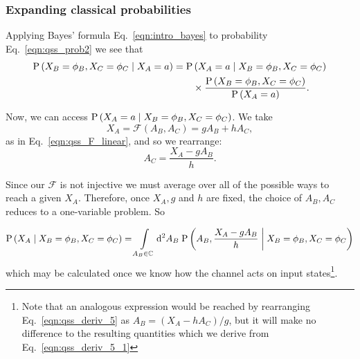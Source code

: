 




\subsubsection{Expanding classical probabilities}

Applying Bayes' formula Eq.~\ref{eqn:intro_bayes} to probability Eq.~\ref{eqn:qss_prob2} we see that
\begin{align}
\text{P}\left(X_B=\phi_B, X_C=\phi_C \; \middle| \; X_A=a\right) = \text{P}&\left(X_A=a \; \middle| \; X_B=\phi_B, X_C=\phi_C\right) \notag \\
&\times \frac{\text{P}\left(X_B=\phi_B, X_C=\phi_C\right)}{\text{P}\left(X_A=a\right)}.
\end{align}


\noindent Now, we can access $\text{P}\left(X_A=a \; \middle| \; X_B=\phi_B, X_C=\phi_C\right)$. 
We take
\begin{equation}\label{eqn:qss_deriv_5}
X_A = \mathcal{F}\left(A_B, A_C\right) = g A_B + h A_C,
\end{equation}
as in Eq.~\ref{eqn:qss_F_linear}, and so we rearrange:
\begin{equation}
A_C = \frac{X_A - g A_B}{h}.
\end{equation}

\noindent Since our $\mathcal{F}$ is not injective %
we must average over all of the possible ways to reach a given $X_A$. Therefore, once $X_A, g$ and $h$ are fixed, the choice of $A_B, A_C$ reduces to a one-variable problem. So

\begin{equation}\label{eqn:qss_deriv_5_1}
\text{P}\left(X_A \; \middle| \; X_B=\phi_B, X_C=\phi_C\right) = \int\limits_{A_B \in \mathbb{C}} \mathop{}\!\mathrm{d^2} A_B \; \text{P}\left(A_B , \frac{X_A - g A_B}{h} \; \middle| \; X_B=\phi_B, X_C=\phi_C\right)
\end{equation}
which may be calculated once we know how the channel acts on input states\footnote{Note that an analogous expression would be reached by rearranging Eq.~\ref{eqn:qss_deriv_5} as $A_B = \left(X_A - h A_C\right)/g$, but it will make no difference to the resulting quantities which we derive from Eq.~\ref{eqn:qss_deriv_5_1}}.

